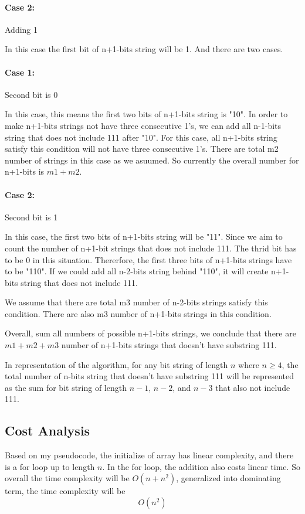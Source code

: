 \documentclass{article}
\begin{document}
\paragraph*{Case 2:} Adding 1

In this case the first bit of n+1-bits string will be 1. And there are two cases.
\paragraph*{Case 1:} Second bit is 0

In this case, this means the first two bits of n+1-bits string is "10". In order to make n+1-bits strings
not have three consecutive 1's, we can add all n-1-bits string that does not include 111 after "10". For this case,
all n+1-bits string satisfy this condition will not have three consecutive 1's. There are total m2 number of strings in this case
as we asuumed. So currently the overall number for n+1-bits is $m1+m2$.
\paragraph*{Case 2:} Second bit is 1

In this case, the first two bits of n+1-bits string will be "11". Since we aim to count the number of n+1-bit strings
that does not include 111. The thrid bit has to be 0 in this situation. Thererfore, the first three bits of n+1-bits strings 
have to be "110". If we could add all n-2-bits string behind "110", it will create n+1-bits string that does not include 111.

We assume that there are total m3 number of n-2-bits strings satisfy this condition. There are also m3 number of n+1-bits strings
in this condition.

Overall, sum all numbers of possible n+1-bits strings, we conclude that there are $m1+m2+m3$ number of n+1-bits strings
that doesn't have substring 111.

In representation of the algorithm, for any bit string of length $n$ where $n \geq 4$, the total number of n-bits string that 
doesn't have substring 111 will be represented as the sum for bit string of length $n-1$, $n-2$, and $n-3$ that also not include 111.

\subsection*{Cost Analysis}

Based on my pseudocode, the initialize of array has linear complexity, and there is a for loop up to length $n$. In the for loop, the addition also costs linear time.
So overall the time complexity will be $O(n+n^2)$, generalized into dominating term, the time complexity will be 
$$O(n^2)$$
\end{document}
